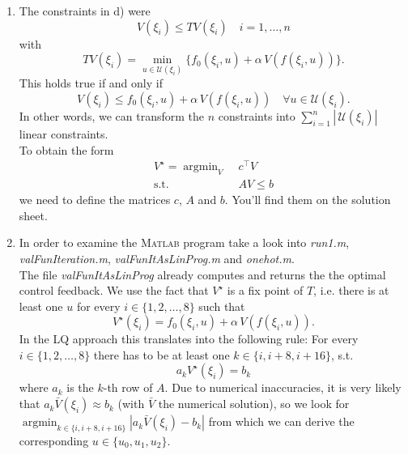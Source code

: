 \documentclass[12pt,pdftex,a4paper]{scrartcl}
\DeclareMathOperator*{\argmin}{argmin}
\begin{document}
\begin{enumerate}
	\item The constraints in d) were
	\begin{equation*}
		V(\xi_i) \le TV(\xi_i) \quad i = 1,\ldots, n
	\end{equation*}
	with
	\begin{equation*}
		TV(\xi_i) = \min_{u\in\mathcal{U}(\xi_i)}\{ f_0(\xi_i,u) + \alpha\,V(f(\xi_i,u))\}.
	\end{equation*}
	This holds true if and only if
	\begin{equation*}
		V(\xi_i) \le  f_0(\xi_i,u) + \alpha\,V(f(\xi_i,u))\quad \forall u\in\mathcal{U}(\xi_i).
	\end{equation*}
	In other words, we can transform the $n$ constraints into $\sum_{i=1}^n |\,\mathcal{U}(\xi_i)|$ linear constraints.\\
	To obtain the form
	\begin{equation*}
		\begin{split}
			V^\star = \argmin_V \;& c^\top V\\
			\text{s.t.} \;& AV \le b
		\end{split}
	\end{equation*}
	we need to define the matrices $c$, $A$ and $b$. You'll find them on the solution sheet.
	
	\item In order to examine the \textsc{Matlab} program take a look into \emph{run1.m}, \emph{valFunIteration.m}, \emph{valFunItAsLinProg.m} and \emph{onehot.m}.\\
	The file \emph{valFunItAsLinProg} already computes and returns the the optimal control feedback. We use the fact that $V^\star$ is a fix point of $T$, i.e. there is at least one $u$ for every $i \in \{1,2,\ldots ,8\}$ such that
	\begin{equation*}
		V^\star(\xi_i) =  f_0(\xi_i,u) + \alpha\,V(f(\xi_i,u)).
	\end{equation*}
	In the LQ approach this translates into the following rule: For every $i \in \{1,2,\ldots ,8\}$ there has to be at least one $k \in \{i, i+8, i+16\}$, s.t.
	\begin{equation*}
		a_k V^\star(\xi_i) = b_k
	\end{equation*}
	where $a_k$ is the $k$-th row of $A$. Due to numerical inaccuracies, it is very likely that $a_k \bar{V}(\xi_i) \approx b_k$ (with $\bar{V}$ the numerical solution), so we look for $\argmin_{k \in \{i, i+8, i+16\}} |a_k \bar{V}(\xi_i) - b_k|$ from which we can derive the corresponding $u\in\{u_0,u_1,u_2\}$.
\end{enumerate}
\end{document}
